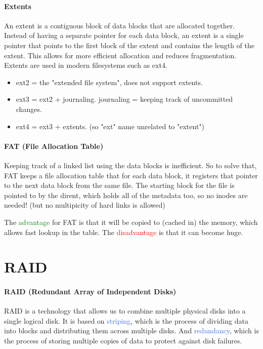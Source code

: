 \documentclass[openany,12pt]{book}
\newcommand{\red}[1]{\textcolor{Red}{#1}}
\newcommand{\blue}[1]{\textcolor{RoyalBlue}{#1}}
\newcommand{\green}[1]{\textcolor{Green}{#1}}
\begin{document}
\paragraph{Extents} An extent is a contiguous block of data blocks that are allocated together. Instead of having a separate pointer for each data block, an extent is a single pointer that points to the first block of the extent and contains the length of the extent. This allows for more efficient allocation and reduces fragmentation. Extents are used in modern filesystems such as ext4. 

\begin{itemize}
  \item ext2 = the "extended file system", does not support extents.
  \item ext3 = ext2 + journaling. journaling = keeping track of uncommitted changes.
  \item ext4 = ext3 + extents. (so "ext" name unrelated to "extent")
\end{itemize}


\paragraph{FAT (File Allocation Table)} Keeping track of a linked list using the data blocks is inefficient. So to solve that, FAT keeps a file allocation table that for each data block, it registers that pointer to the next data block from the same file. The starting block for the file is pointed to by the dirent, which holds all of the metadata too, so no inodes are needed! (but no multipicity of hard links is allowed)

The \green{advantage} for FAT is that it will be copied to (cached in) the memory, which allows fast lookup in the table. The \red{disadvantage} is that it can become huge.



\section*{RAID}

\paragraph{RAID (Redundant Array of Independent Disks)} RAID is a technology that allows us to combine multiple physical disks into a single logical disk. It is based on \blue{striping}, which is the process of dividing data into blocks and distributing them across multiple disks. And \blue{redundancy}, which is the process of storing multiple copies of data to protect against disk failures. 
\end{document}
